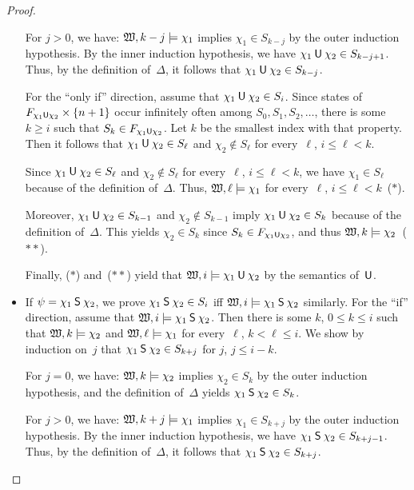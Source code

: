 \begin{proof}
\begin{itemize}
            For $j>0$, we have: $\mathfrak{W},k-j\models\chi_1$ implies
            $\chi_1\in S_{k-j}$ by the outer induction hypothesis.  By the inner
            induction hypothesis, we have $\chi_1\mathbin{\mathsf{U}}\chi_2\in S_{k-j+1}$.
            Thus, by the definition of~$\Delta$, it follows that
            $\chi_1\mathbin{\mathsf{U}}\chi_2\in S_{k-j}$.

            For the \enquote{only if} direction, assume that
            $\chi_1\mathbin{\mathsf{U}}\chi_2\in S_i$.  Since states of
            $F_{\chi_1\mathbin{\mathsf{U}}\chi_2}\times\{n+1\}$ occur infinitely often among
            $S_0,S_1,S_2,\dots$, there is some $k\ge i$ such that
            $S_k\in F_{\chi_1\mathbin{\mathsf{U}}\chi_2}$.  Let $k$ be the smallest index with
            that property.  Then it follows that $\chi_1\mathbin{\mathsf{U}}\chi_2\in S_\ell$
            and $\chi_2\notin S_\ell$ for every~$\ell$, $i\le\ell<k$.

            Since $\chi_1\mathbin{\mathsf{U}}\chi_2\in S_\ell$ and $\chi_2\notin S_\ell$ for
            every~$\ell$, $i\le\ell<k$, we have $\chi_1\in S_\ell$ because of
            the definition of~$\Delta$.  Thus, $\mathfrak{W},\ell\models\chi_1$ for
            every~$\ell$, $i\le\ell<k$~($\ast$).

            Moreover, $\chi_1\mathbin{\mathsf{U}}\chi_2\in S_{k-1}$ and $\chi_2\notin S_{k-1}$
            imply $\chi_1\mathbin{\mathsf{U}}\chi_2\in S_k$ because of the definition
            of~$\Delta$.  This yields $\chi_2\in S_k$ since
            $S_k\in F_{\chi_1\mathbin{\mathsf{U}}\chi_2}$, and thus
            $\mathfrak{W},k\models\chi_2$~($\ast\ast$).

            Finally, ($\ast$) and~($\ast\ast$) yield that
            $\mathfrak{W},i\models\chi_1\mathbin{\mathsf{U}}\chi_2$ by the semantics of~$\mathbin{\mathsf{U}}$.
        \item If $\psi=\chi_1\mathbin{\mathsf{S}}\chi_2$, we prove $\chi_1\mathbin{\mathsf{S}}\chi_2\in S_i$
            iff $\mathfrak{W},i\models\chi_1\mathbin{\mathsf{S}}\chi_2$ similarly.
            For the \enquote{if} direction, assume that
            $\mathfrak{W},i\models\chi_1\mathbin{\mathsf{S}}\chi_2$.  Then there is some $k$,
            $0\le k\le i$ such that $\mathfrak{W},k\models\chi_2$ and
            $\mathfrak{W},\ell\models\chi_1$ for every~$\ell$, $k<\ell\le i$.  We show
            by induction on~$j$ that $\chi_1\mathbin{\mathsf{S}}\chi_2\in S_{k+j}$ for $j$,
            $j\le i-k$.

            For $j=0$, we have: $\mathfrak{W},k\models\chi_2$ implies $\chi_2\in S_k$ by
            the outer induction hypothesis, and the definition of~$\Delta$
            yields $\chi_1\mathbin{\mathsf{S}}\chi_2\in S_k$.

            For $j>0$, we have: $\mathfrak{W},k+j\models\chi_1$ implies
            $\chi_1\in S_{k+j}$ by the outer induction hypothesis.  By the inner
            induction hypothesis, we have $\chi_1\mathbin{\mathsf{S}}\chi_2\in S_{k+j-1}$.
            Thus, by the definition of~$\Delta$, it follows that
            $\chi_1\mathbin{\mathsf{S}}\chi_2\in S_{k+j}$.


\end{itemize}
\end{proof}
